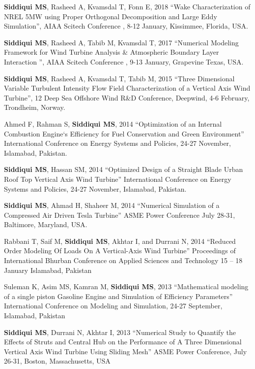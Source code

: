\begin{cventries}
	\cventry
	{} %
	{} %
	{} %
	{} %
	{
		\begin{cvitems} 
			\item{\textbf{Siddiqui MS}, Rasheed A, Kvamsdal T, Fonn E, 2018 “Wake Characterization of NREL 5MW using Proper Orthogonal Decomposition and Large Eddy Simulation”, AIAA Scitech Conference , 8-12 January, Kissimmee, Florida, USA.}
			\item{\textbf{Siddiqui MS}, Rasheed A, Tabib M, Kvamsdal T, 2017 “Numerical Modeling Framework for Wind Turbine Analysis \& Atmospheric Boundary Layer Interaction  ”, AIAA Scitech Conference , 9-13 January, Grapevine Texas, USA.}
			\item {\textbf{Siddiqui MS}, Rasheed A, Kvamsdal T, Tabib M, 2015 “Three Dimensional Variable Turbulent Intensity Flow Field Characterization of a Vertical Axis Wind Turbine”, 12 Deep Sea Offshore Wind R$\&$D Conference, Deepwind, 4-6 February, Trondheim, Norway.}
			\item {Ahmed F, Rahman S, \textbf{Siddiqui MS}, 2014 “Optimization of an Internal Combustion Engine`s Efficiency for Fuel Conservation and Green Environment” International Conference on Energy Systems and Policies, 24-27 November, Islamabad, Pakistan.}
			\item {\textbf{Siddiqui MS}, Hassan SM, 2014 “Optimized Design of a Straight Blade Urban Roof Top Vertical Axis Wind Turbine” International Conference on Energy Systems and Policies, 24-27 November, Islamabad, Pakistan.}
			\item{\textbf{Siddiqui MS}, Ahmad H, Shaheer M, 2014 “Numerical Simulation of a Compressed Air Driven Tesla Turbine” ASME Power Conference July 28-31, Baltimore, Maryland, USA.}
			\item{Rabbani T, Saif M, \textbf{Siddiqui MS}, Akhtar I, and Durrani N, 2014 “Reduced Order Modeling Of Loads On A Vertical-Axis Wind Turbine” Proceedings of International Bhurban Conference on Applied Sciences and Technology 15 – 18 January Islamabad, Pakistan}
			\item{Suleman K, Asim MS, Kamran M, \textbf{Siddiqui MS}, 2013 “Mathematical modeling of a single piston Gasoline Engine and Simulation of Efficiency Parameters” International Conference on Modeling and Simulation, 24-27 September, Islamabad, Pakistan}
			\item{\textbf{Siddiqui MS}, Durrani N, Akhtar I, 2013 “Numerical Study to Quantify the Effects of Struts and Central Hub on the Performance of A Three Dimensional Vertical Axis Wind Turbine Using Sliding Mesh” ASME Power Conference, July 26-31, Boston, Massachusetts, USA}

\end{cvitems}}
\end{cventries}

